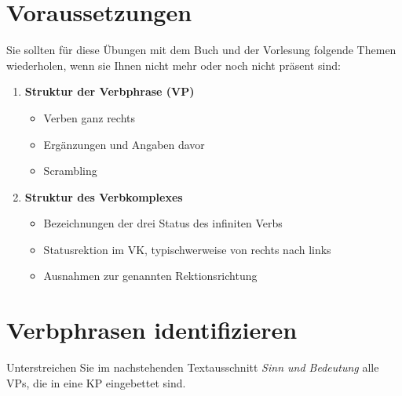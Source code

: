 \section*{Voraussetzungen}

Sie sollten für diese Übungen mit dem Buch und der Vorlesung folgende Themen wiederholen, wenn sie Ihnen nicht mehr oder noch nicht präsent sind:

\begin{enumerate}\Lf
  \item \textbf{Struktur der Verbphrase (VP)}
    \begin{itemize}\Lf
      \item Verben ganz rechts
      \item Ergänzungen und Angaben davor
      \item Scrambling
    \end{itemize}
  \item \textbf{Struktur des Verbkomplexes}
    \begin{itemize}\Lf
      \item Bezeichnungen der drei Status des infiniten Verbs
      \item Statusrektion im VK, typischwerweise von rechts nach links
      \item Ausnahmen zur genannten Rektionsrichtung
    \end{itemize}
\end{enumerate}

\section{Verbphrasen identifizieren}

Unterstreichen Sie im nachstehenden Textausschnitt \textit{Sinn und Bedeutung} alle VPs, die in eine KP eingebettet sind.


